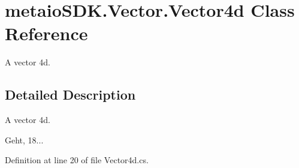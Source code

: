 \section{metaio\-S\-D\-K.\-Vector.\-Vector4d Class Reference}
\label{classmetaio_s_d_k_1_1_vector_1_1_vector4d}


A vector 4d.  




\subsection{Detailed Description}
A vector 4d. 

Geht, 18... 

Definition at line 20 of file Vector4d.\-cs.

